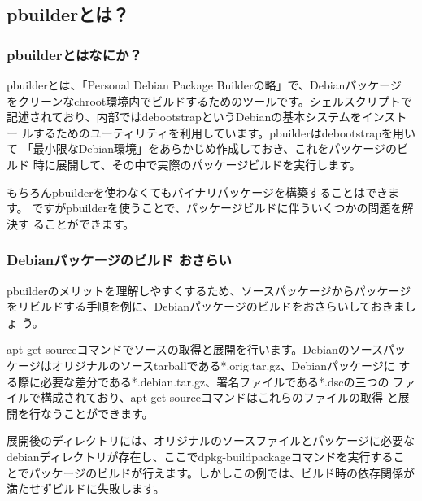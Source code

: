 \documentclass[mingoth,a4paper]{jsarticle}
\begin{document}
\subsection{pbuilderとは？}

\subsubsection{pbuilderとはなにか？}

pbuilderとは、「Personal Debian Package Builderの略」で、Debianパッケージ
をクリーンなchroot環境内でビルドするためのツールです。シェルスクリプトで
記述されており、内部ではdebootstrapというDebianの基本システムをインストー
ルするためのユーティリティを利用しています。pbuilderはdebootstrapを用いて
「最小限なDebian環境」をあらかじめ作成しておき、これをパッケージのビルド
時に展開して、その中で実際のパッケージビルドを実行します。

もちろんpbuilderを使わなくてもバイナリパッケージを構築することはできます。
ですがpbuilderを使うことで、パッケージビルドに伴ういくつかの問題を解決す
ることができます。

\subsubsection{Debianパッケージのビルド おさらい}

pbuilderのメリットを理解しやすくするため、ソースパッケージからパッケージ
をリビルドする手順を例に、Debianパッケージのビルドをおさらいしておきましょ
う。

apt-get sourceコマンドでソースの取得と展開を行います。Debianのソースパッ
ケージはオリジナルのソースtarballである*.orig.tar.gz、Debianパッケージに
する際に必要な差分である*.debian.tar.gz、署名ファイルである*.dscの三つの
ファイルで構成されており、apt-get sourceコマンドはこれらのファイルの取得
と展開を行なうことができます。

展開後のディレクトリには、オリジナルのソースファイルとパッケージに必要な
debianディレクトリが存在し、ここでdpkg-buildpackageコマンドを実行するこ
とでパッケージのビルドが行えます。しかしこの例では、ビルド時の依存関係が
満たせずビルドに失敗します。

\end{document}
